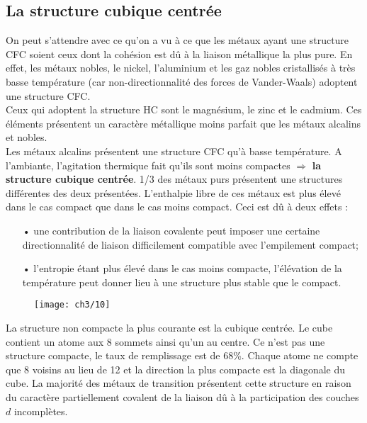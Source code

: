 		\subsection{La structure cubique centrée}
			On peut s'attendre avec ce qu'on a vu à ce que les métaux ayant une structure CFC soient ceux dont la cohésion est dû à la liaison métallique la plus pure. En effet, les métaux nobles, le nickel, l'aluminium et les gaz nobles cristallisés à très basse température (car non-directionnalité des forces de Vander-Waals) adoptent une structure CFC. \\
			Ceux qui adoptent la structure HC sont le magnésium, le zinc et le cadmium. Ces éléments présentent un caractère métallique moins parfait que les métaux alcalins et nobles. 	\\
			Les métaux alcalins présentent une structure CFC qu'à basse température. A l'ambiante, l'agitation thermique fait qu'ils sont moins compactes $\Rightarrow$	\textbf{la structure cubique centrée}. 1/3 des métaux purs présentent une structures différentes des deux présentées. L'enthalpie libre de ces métaux est plus élevé dans le cas compact que dans le cas moins compact. Ceci est dû à  deux effets : 
			\begin{itemize}
				\item[•] une contribution de la liaison covalente peut imposer une certaine directionnalité de liaison difficilement compatible avec l'empilement compact;
				\item[•] l'entropie étant plus élevé dans le cas moins compacte, l'élévation de la température peut donner lieu à une structure plus stable que le compact. 
\end{itemize}		
			
			\begin{wrapfigure}[5]{l}{5cm}
			\texttt{[image: ch3/10]}
			\end{wrapfigure}
			La structure non compacte la plus courante est la cubique centrée. Le cube contient un atome aux 8 sommets ainsi qu'un au centre. Ce n'est pas une structure compacte, le taux de remplissage est de 68\%. Chaque atome ne compte que 8 voisins au lieu de 12 et la direction la plus compacte est la diagonale du cube. La majorité des métaux de transition présentent cette structure en raison du caractère partiellement covalent de la liaison dû à la participation des couches $d$ incomplètes. 
			

